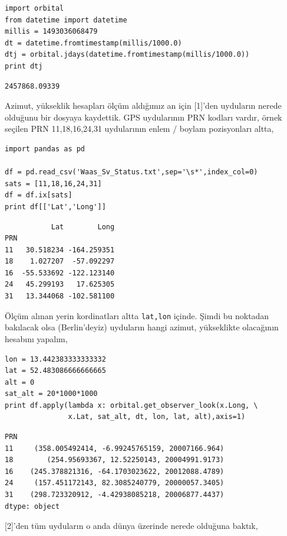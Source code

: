 \documentclass[12pt,fleqn]{article}\usepackage{../../common}
\begin{document}
\begin{verbatim}
import orbital
from datetime import datetime
millis = 1493036068479
dt = datetime.fromtimestamp(millis/1000.0)
dtj = orbital.jdays(datetime.fromtimestamp(millis/1000.0))
print dtj
\end{verbatim}

\begin{verbatim}
2457868.09339
\end{verbatim}

Azimut, yükseklik hesapları ölçüm aldığımız an için [1]'den uyduların
nerede olduğunu bir dosyaya kaydettik. GPS uydularının PRN kodları vardır,
örnek seçilen PRN 11,18,16,24,31 uydularının enlem / boylam pozisyonları
altta,

\begin{verbatim}
import pandas as pd

df = pd.read_csv('Waas_Sv_Status.txt',sep='\s*',index_col=0)
sats = [11,18,16,24,31]
df = df.ix[sats]
print df[['Lat','Long']]
\end{verbatim}

\begin{verbatim}
           Lat        Long
PRN                       
11   30.518234 -164.259351
18    1.027207  -57.092297
16  -55.533692 -122.123140
24   45.299193   17.625305
31   13.344068 -102.581100
\end{verbatim}

Ölçüm alınan yerin kordinatları altta \verb!lat,lon!  içinde. Şimdi bu
noktadan bakılacak olsa (Berlin'deyiz) uyduların hangi azimut, yükseklikte
olacağının hesabını yapalım,

\begin{verbatim}
lon = 13.442383333333332
lat = 52.483086666666665
alt = 0
sat_alt = 20*1000*1000
print df.apply(lambda x: orbital.get_observer_look(x.Long, \
               x.Lat, sat_alt, dt, lon, lat, alt),axis=1)
\end{verbatim}

\begin{verbatim}
PRN
11     (358.005492414, -6.99245765159, 20007166.964)
18        (254.95693367, 12.52250143, 20004991.9173)
16    (245.378821316, -64.1703023622, 20012088.4789)
24     (157.451172143, 82.3085240779, 20000057.3405)
31    (298.723320912, -4.42938085218, 20006877.4437)
dtype: object
\end{verbatim}

[2]'den tüm uyduların o anda dünya üzerinde nerede olduğuna baktık,
\end{document}
